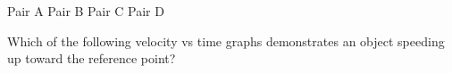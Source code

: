 \documentclass[answers]{exam}
\begin{document}
\begin{questions}
{\color{white}
\begin{randomizeoneparchoices}[norandomize,]
    \choice Pair A
    \correctchoice Pair B
    \choice Pair C
    \choice Pair D
\end{randomizeoneparchoices}
}

\question 
Which of the following velocity vs time graphs demonstrates an object speeding up toward the reference point?

\begin{center}
\end{center}

\vspace{1ex}


\end{questions}
\end{document}

